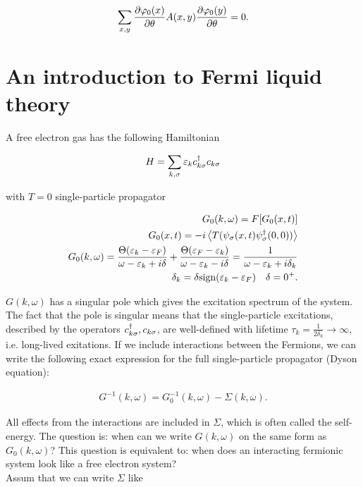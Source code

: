 \begin{align*}
    \sum_{x,y} \pdv{\varphi_0(x)}{\theta}A(x,y) \pdv{\varphi_0(y)}{\theta} = 0. 
\end{align*}

\section{An introduction to Fermi liquid theory}

A free electron gas has the following Hamiltonian 

\begin{align*}
    H = \sum_{k,\sigma} \varepsilon_k c^{\dagger}_{k\sigma}c_{k\sigma}
\end{align*}

with $T = 0$ single-particle propagator 

\begin{align*}
    G_0(k,\omega) = F[G_0(x,t)] \\
    G_0(x,t) = -i \expval{T(\psi_\sigma(x,t) \psi^{\dagger}_\sigma(0,0))} \\ 
    G_0(k,\omega) = \frac{\Theta(\varepsilon_k - \varepsilon_F)}{\omega - \varepsilon_k + i\delta} + \frac{\Theta(\varepsilon_F - \varepsilon_k)}{\omega - \varepsilon_k - i\delta} = \frac{1}{\omega - \varepsilon_k +i\delta_k} \\ 
    \delta_k = \delta \text{sign}(\varepsilon_k - \varepsilon_F)  \quad \delta = 0^+.
\end{align*}

$G(k,\omega)$ has a singular pole which gives the excitation spectrum of the system. The fact that the pole is singular means that the single-particle excitations, described by the operators $c^{\dagger}_{k\sigma}, c_{k\sigma}$, are well-defined with lifetime $\tau_k = \frac{1}{2\delta_k} \to \infty$, i.e. long-lived exitations. If we include interactions between the Fermions, we can write the following exact expression for the full single-particle propagator (Dyson equation):

\begin{align*}
    G^{-1}(k,\omega) = G_0^{-1}(k,\omega) - \Sigma(k,\omega). 
\end{align*}

All effects from the interactions are included in $\Sigma$, which is often called the self-energy. The question is: when can we write $G(k,\omega)$ on the same form as $G_0(k,\omega)$? This question is equivalent to: when does an interacting fermionic system look like a free electron system? \\ 

Assum that we can write $\Sigma$ like 

